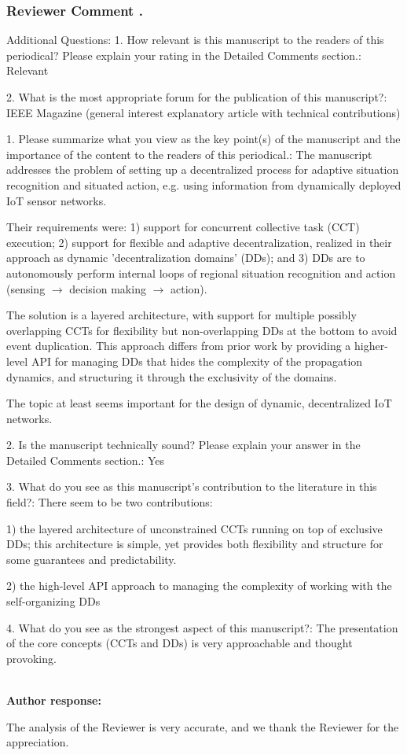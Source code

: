\documentclass{article}
\newcounter{reviewer}
\newcounter{comment}[reviewer]
\newcommand{\comment}[1]{
	\subsubsection*{\refstepcounter{comment}Reviewer Comment \arabic{reviewer}.\arabic{comment}} %
	\colorbox{gray!10}{\parbox[t]{\linewidth}{\setlength{\parskip}{0.5\baselineskip}%
 #1 }}
}
\newcommand{\reply}[1]{	\\[2pt]
	\textbf{Author response:} 	
	#1
}
\begin{document}
\comment{
Additional Questions:
1. How relevant is this manuscript to the readers of this periodical? Please explain your rating in the Detailed Comments section.: Relevant

2. What is the most appropriate forum for the publication of this manuscript?: IEEE Magazine (general interest explanatory article with technical contributions)

1. Please summarize what you view as the key point(s) of the manuscript and the importance of the content to the readers of this periodical.: The manuscript addresses the problem of setting up a decentralized process for adaptive situation recognition and situated action, e.g. using information from dynamically deployed IoT sensor networks.

Their requirements were: 1) support for concurrent collective task (CCT) execution; 2) support for flexible and adaptive decentralization, realized in their approach as dynamic 'decentralization domains' (DDs); and 3) DDs are to autonomously perform internal loops of regional situation recognition and action (sensing $\to$ decision making $\to$ action).

The solution is a layered architecture, with support for multiple possibly overlapping CCTs for flexibility but non-overlapping DDs at the bottom to avoid event duplication.
This approach differs from prior work by providing a higher-level API for managing DDs that hides the complexity of the propagation dynamics, and structuring it through the exclusivity of the domains.

The topic at least seems important for the design of dynamic, decentralized IoT networks.

2. Is the manuscript technically sound? Please explain your answer in the Detailed Comments section.: Yes

3. What do you see as this manuscript's contribution to the literature in this field?: There seem to be two contributions:

1) the layered architecture of unconstrained CCTs running on top of exclusive DDs; this architecture is simple, yet provides both flexibility and structure for some guarantees and predictability.

2) the high-level API approach to managing the complexity of working with the self-organizing DDs

4. What do you see as the strongest aspect of this manuscript?: The presentation of the core concepts (CCTs and DDs) is very approachable and thought provoking.
}
\reply{
The analysis of the Reviewer is very accurate, and we thank the Reviewer for the appreciation.
}
\end{document}
